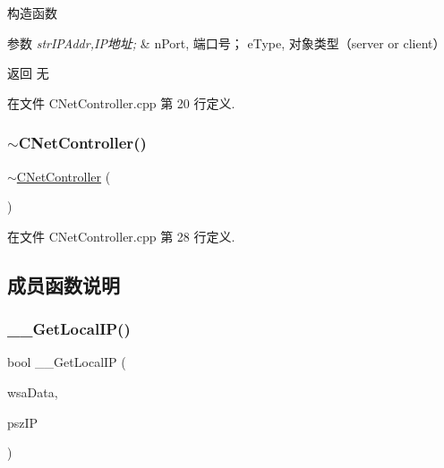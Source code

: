 构造函数 


\begin{DoxyParams}{参数}
{\em str\+I\+P\+Addr,I\+P地址;} & n\+Port, 端口号； e\+Type, 对象类型（server or client）\\
\hline
\end{DoxyParams}
\begin{DoxyReturn}{返回}
无 
\end{DoxyReturn}


在文件 C\+Net\+Controller.\+cpp 第 20 行定义.

\mbox{\label{class_c_net_controller_a27201190f2a9821379921627ab66a52d}} 
\subsubsection{\texorpdfstring{$\sim$\+C\+Net\+Controller()}{~CNetController()}}
{\footnotesize\ttfamily $\sim$\hyperlink{class_c_net_controller}{C\+Net\+Controller} (\begin{DoxyParamCaption}{ }\end{DoxyParamCaption})}



在文件 C\+Net\+Controller.\+cpp 第 28 行定义.



\subsection{成员函数说明}
\mbox{\label{class_c_net_controller_aa231c51362064abdd6bce973f73dca8e}} 
\subsubsection{\texorpdfstring{\+\_\+\+\_\+\+Get\+Local\+I\+P()}{\_\_GetLocalIP()}}
{\footnotesize\ttfamily bool \+\_\+\+\_\+\+Get\+Local\+IP (\begin{DoxyParamCaption}\item[{W\+S\+A\+D\+A\+TA}]{wsa\+Data,  }\item[{char $\ast$}]{psz\+IP }\end{DoxyParamCaption})\hspace{0.3cm}{\ttfamily [private]}}



